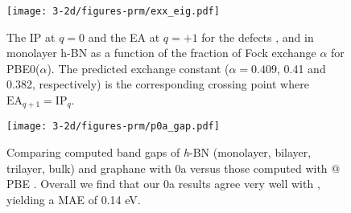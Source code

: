 \begin{figure}[h]
\begin{center}
\texttt{[image: 3-2d/figures-prm/exx\_eig.pdf]}
\caption{The IP at $q=0$ and the EA at $q=+1$ for the defects \cbns , \cn and \vncb in monolayer h-BN as a function of the fraction of Fock exchange $\alpha$ for PBE0($\alpha$). The predicted exchange constant ($\alpha = 0.409$, 0.41 and 0.382, respectively) is the corresponding crossing point where $\text{EA}_{q+1}=\text{IP}_{q}$.} \label{fig:ipea}
\end{center}
\end{figure}

\begin{figure}[h]
\begin{center}
\texttt{[image: 3-2d/figures-prm/p0a\_gap.pdf]}
\caption{Comparing computed band gaps of \textit{h}-BN (monolayer, bilayer, trilayer, bulk) and graphane with \p0a versus those computed with \gwns$@$PBE . Overall we find that our \p0a results agree very well with \gwns , yielding a MAE of 0.14 eV. } \label{fig:p0a}
\end{center}
\end{figure}

\newpage

